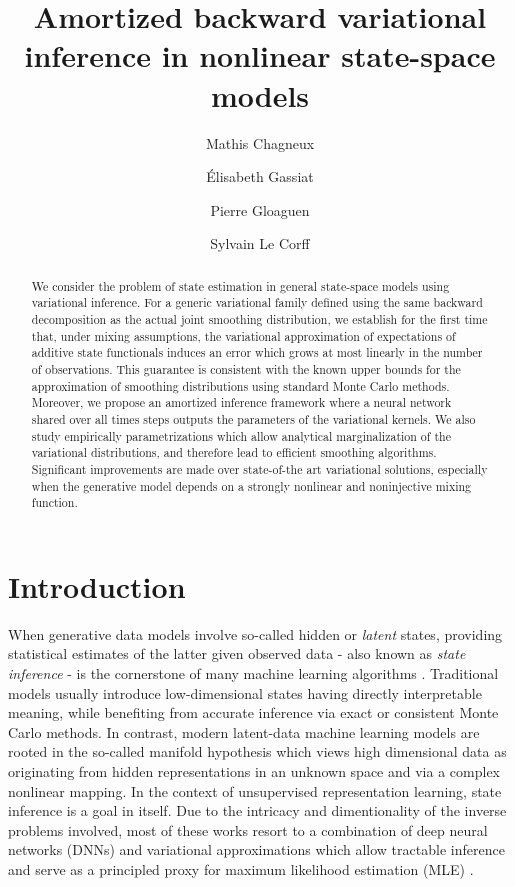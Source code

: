 \documentclass{article}
\title{Amortized backward variational inference in nonlinear state-space models}
\date{}
\author[$\dag$]{ Mathis Chagneux}
\author[$\ddag$]{\'Elisabeth Gassiat}
\author[$\star$]{ Pierre Gloaguen}
\author[$\top$]{Sylvain Le Corff}
\affil[$\dag$]{{\small T\'el\'ecom Paris, Institut Polytechnique de Paris, Palaiseau.}}
\affil[$\ddag$]{{\small Universit\'e Paris-Saclay, CNRS, Laboratoire de math\'ematiques d'Orsay.}}
\affil[$\star$]{{\small AgroParisTech,  UMR MIA 518, Palaiseau.}}
\affil[$\top$]{{\small Samovar, T\'el\'ecom SudParis, d\'epartement CITI, TIPIC, Institut Polytechnique de Paris, Palaiseau.}}
\begin{document}
\maketitle


\begin{abstract}

We consider the problem of state estimation in general state-space models using variational inference. For a generic variational family defined using  the same  backward decomposition  as the actual joint smoothing distribution, we establish for the first time that, under mixing assumptions, the variational approximation of expectations of additive state functionals induces an error which grows at most linearly in the number of observations. 
This guarantee is consistent with the known upper bounds for the approximation of smoothing distributions using standard Monte Carlo methods. Moreover, we propose an amortized inference framework where a neural network shared over all times steps outputs the parameters of the variational kernels.
We also study empirically parametrizations which allow analytical marginalization of the variational distributions, and therefore lead to efficient smoothing algorithms. 
Significant improvements are made over state-of-the art variational solutions, especially when the generative model depends on  a strongly nonlinear and noninjective mixing function.

\end{abstract}


\section{Introduction}

When generative data models involve so-called hidden or \textit{latent} states, providing statistical estimates of the latter given observed data - also known as \textit{state inference} - is the cornerstone of many machine learning algorithms \cite{dempster1977maximum, Kingma2014AutoEncodingVB}. 
Traditional models usually introduce low-dimensional states having directly interpretable meaning, while benefiting from accurate inference via exact or consistent Monte Carlo methods. 
In contrast, modern latent-data machine learning models are rooted in the so-called manifold hypothesis which views high dimensional data as originating from hidden representations in an unknown space and via a complex nonlinear mapping. In the context of unsupervised representation learning, state inference is a goal in itself. 
Due to the intricacy and dimentionality of the inverse problems involved, most of these works resort to a combination of deep neural networks (DNNs) and variational approximations which allow tractable inference and serve as a principled proxy for maximum likelihood estimation (MLE) \cite{Higgins2017betaVAELB, Locatello2020WeaklySupervisedDW}.
\end{document}

